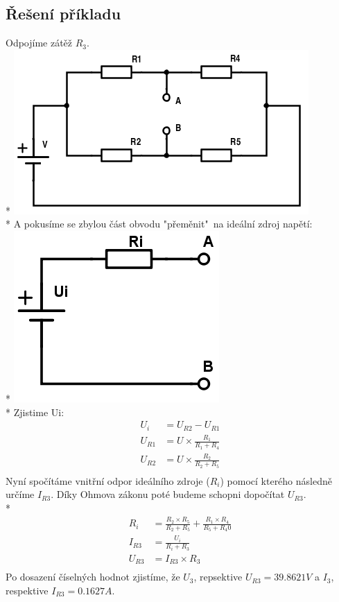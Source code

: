 \documentclass[a4paper, 10pt, fleqn]{article}
\begin{document}
\subsection*{Řešení příkladu}
Odpojíme zátěž $R_{3}$. \\*
\includegraphics[scale=0.8]{IEL_OBR/2c.png} \\*
A pokusíme se zbylou část obvodu "přeměnit"~na ideální zdroj napětí: \\*
\includegraphics[scale=0.5]{IEL_OBR/2d.png} \\*
Zjistime Ui: \\
\begin{align*}
 U_{i} &= U_{R2} - U_{R1} \\
 U_{R1} &= U \times \frac{R_{1}}{R_{1} + R_{4}} \\
 U_{R2} &= U \times \frac{R_{2}}{R_{2} + R_{5}} \\
\end{align*}
\newpage
\noindent
Nyní spočítáme vnitřní odpor ideálního zdroje ($R_{i}$) pomocí kterého následně
určíme $I_{R3}$. Díky Ohmova zákonu poté budeme schopni dopočítat $U_{R3}$. \\*
\begin{align*}
 R_{i} &= \frac{R_{2} \times R_{5}}{R_{2} + R_{5}} + \frac{R_{1} \times R_{4}}{R_{5} + R_{4}0}\\
 I_{R3} &= \frac{U_{i}}{R_{i} + R_{3}} \\
 U_{R3} &= I_{R3} \times R_{3} \\
\end{align*}
Po dosazení číselných hodnot zjistíme, že $U_{3}$, repsektive $U_{R3} = 39.8621 V$ a
$I_{3}$, respektive $I_{R3} = 0.1627 A$. 
\end{document}
